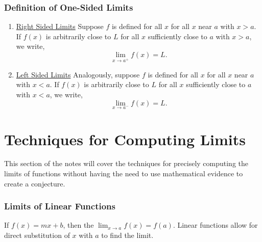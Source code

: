\documentclass{report}
\begin{document}
\subsubsection{Definition of One-Sided Limits}
\begin{enumerate}
    \item \underline{Right Sided Limits} Suppose $f$ is defined for all $x$ for all $x$ near $a$ with $x>a$. If $f(x)$ is arbitrarily close to $L$ for all $x$ sufficiently close to $a$ with $x>a$, we write,
    \begin{equation*}
        \lim_{x \to a^+}  f(x)=L.
    \end{equation*}
    \item \underline{Left Sided Limits} Analogously, suppose $f$ is defined for all $x$ for all $x$ near $a$ with $x<a$. If $f(x)$ is arbitrarily close to $L$ for all $x$ sufficiently close to $a$ with $x<a$, we write, 
    \begin{equation*}
        \lim_{x \to a^-}  f(x)=L.
    \end{equation*}
\end{enumerate}


\newpage
\section{Techniques for Computing Limits}
This section of the notes will cover the techniques for precisely computing the limits of functions without having the need to use mathematical evidence to create a conjecture.

\subsubsection{Limits of Linear Functions}
If $f(x)=mx+b$, then the $\lim_{x \to a}  f(x)=f(a)$. Linear functions allow for direct substitution of $x$ with $a$ to find the limit.

\end{document}
